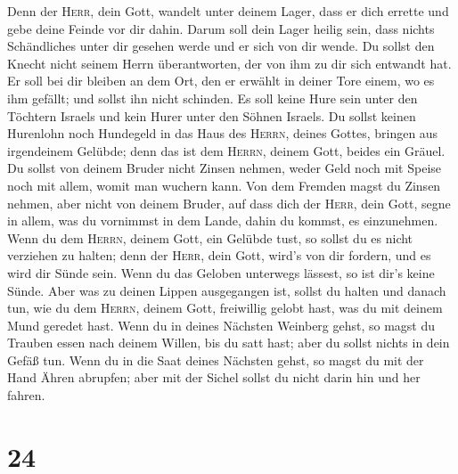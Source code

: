  Denn der \textsc{Herr}, dein Gott, wandelt unter deinem
Lager, dass er dich errette und gebe deine Feinde vor dir dahin. Darum
soll dein Lager heilig sein, dass nichts Schändliches unter dir gesehen
werde und er sich von dir wende.  Du sollst den Knecht
nicht seinem Herrn überantworten, der von ihm zu dir sich entwandt hat.
 Er soll bei dir bleiben an dem Ort, den er erwählt in
deiner Tore einem, wo es ihm gefällt; und sollst ihn nicht schinden.
 Es soll keine Hure sein unter den Töchtern Israels und
kein Hurer unter den Söhnen Israels.  Du sollst keinen
Hurenlohn noch Hundegeld in das Haus des \textsc{Herrn}, deines Gottes,
bringen aus irgendeinem Gelübde; denn das ist dem \textsc{Herrn}, deinem
Gott, beides ein Gräuel.  Du sollst von deinem Bruder
nicht Zinsen nehmen, weder Geld noch mit Speise noch mit allem, womit
man wuchern kann.  Von dem Fremden magst du Zinsen
nehmen, aber nicht von deinem Bruder, auf dass dich der \textsc{Herr},
dein Gott, segne in allem, was du vornimmst in dem Lande, dahin du
kommst, es einzunehmen.  Wenn du dem \textsc{Herrn},
deinem Gott, ein Gelübde tust, so sollst du es nicht verziehen zu
halten; denn der \textsc{Herr}, dein Gott, wird's von dir fordern, und
es wird dir Sünde sein.  Wenn du das Geloben unterwegs
lässest, so ist dir's keine Sünde.  Aber was zu deinen
Lippen ausgegangen ist, sollst du halten und danach tun, wie du dem
\textsc{Herrn}, deinem Gott, freiwillig gelobt hast, was du mit deinem
Mund geredet hast.  Wenn du in deines Nächsten Weinberg
gehst, so magst du Trauben essen nach deinem Willen, bis du satt hast;
aber du sollst nichts in dein Gefäß tun.  Wenn du in die
Saat deines Nächsten gehst, so magst du mit der Hand Ähren abrupfen;
aber mit der Sichel sollst du nicht darin hin und her fahren.

\hypertarget{section-23}{%
\section{24}\label{section-23}}

